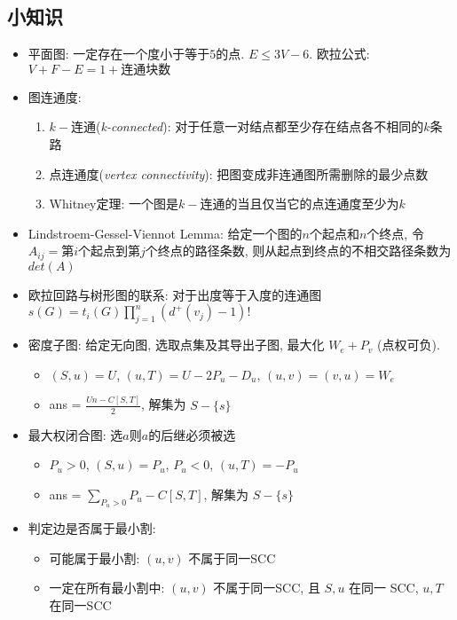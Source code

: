 \documentclass[landscape, twocolumn, 8pt, a4paper, twoside]{extarticle}
\begin{document}
    

%    

%    
  
  \subsection{小知识}
  \begin{itemize}
  \item 平面图: 一定存在一个度小于等于$5$的点. $E \le 3V - 6$. 欧拉公式: $V + F - E = 1 + \mbox{连通块数}$
  \item 图连通度: 
    \begin{enumerate}
    \item $k-$连通(\emph{k-connected}): 对于任意一对结点都至少存在结点各不相同的$k$条路
    \item 点连通度(\emph{vertex connectivity}): 把图变成非连通图所需删除的最少点数
    \item Whitney定理: 一个图是$k-$连通的当且仅当它的点连通度至少为$k$
    \end{enumerate}
  \item Lindstroem-Gessel-Viennot Lemma:
    给定一个图的$n$个起点和$n$个终点, 
    令$A_{ij} = $第$i$个起点到第$j$个终点的路径条数,
    则从起点到终点的不相交路径条数为 $det(A)$
  \item 欧拉回路与树形图的联系: 
    对于出度等于入度的连通图
    $s(G) = t_i(G) \prod_{j = 1}^{n} (d^+(v_j) - 1)! $
  \item 密度子图: 给定无向图, 选取点集及其导出子图, 最大化 $W_e + P_v$ (点权可负).
    \begin{itemize}
    \item $(S, u) = U$, $(u, T) = U - 2 P_u - D_u$, $(u, v) = (v, u) = W_e$
    \item ans = $\frac{Un - C[S, T]}{2}$, 解集为 $S - \{s\}$
    \end{itemize}
  \item 最大权闭合图: 选$a$则$a$的后继必须被选
    \begin{itemize}
    \item $P_u > 0$, $(S, u) = P_u$, $P_u < 0$, $(u, T) = -P_u$
    \item ans = $\sum\limits_{P_u > 0}^{} P_u - C[S, T]$, 解集为 $S - \{s\}$
    \end{itemize}
  \item 判定边是否属于最小割:
    \begin{itemize}
    \item 可能属于最小割: $(u, v)$ 不属于同一SCC
    \item 一定在所有最小割中: $(u, v)$ 不属于同一SCC, 且 $S, u$ 在同一 SCC, $u, T$ 在同一SCC
    \end{itemize}
  \end{itemize}
\end{document}
